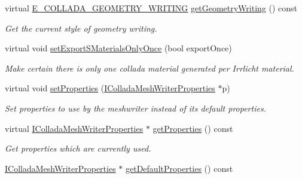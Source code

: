 \begin{DoxyCompactItemize}
\mbox{\label{classirr_1_1scene_1_1IColladaMeshWriter_ab83b1690e233d6742e716aa5a1cf32f2}} 
virtual \hyperlink{namespaceirr_1_1scene_a179008e7c02889459edf81394dbd6959}{E\+\_\+\+C\+O\+L\+L\+A\+D\+A\+\_\+\+G\+E\+O\+M\+E\+T\+R\+Y\+\_\+\+W\+R\+I\+T\+I\+NG} \hyperlink{classirr_1_1scene_1_1IColladaMeshWriter_ab83b1690e233d6742e716aa5a1cf32f2}{get\+Geometry\+Writing} () const
\begin{DoxyCompactList}\small\item\em Get the current style of geometry writing. \end{DoxyCompactList}\item 
virtual void \hyperlink{classirr_1_1scene_1_1IColladaMeshWriter_af6f37ca4a1ef6238cc079f3f5d5eb612}{set\+Export\+S\+Materials\+Only\+Once} (bool export\+Once)
\begin{DoxyCompactList}\small\item\em Make certain there is only one collada material generated per Irrlicht material. \end{DoxyCompactList}\item 
virtual void \hyperlink{classirr_1_1scene_1_1IColladaMeshWriter_acffa89579171224f10e30f2c0d09f8c1}{set\+Properties} (\hyperlink{classirr_1_1scene_1_1IColladaMeshWriterProperties}{I\+Collada\+Mesh\+Writer\+Properties} $\ast$p)
\begin{DoxyCompactList}\small\item\em Set properties to use by the meshwriter instead of it\textquotesingle{}s default properties. \end{DoxyCompactList}\item 
\mbox{\label{classirr_1_1scene_1_1IColladaMeshWriter_acce5ebec91c7f655da4557953df80a7a}} 
virtual \hyperlink{classirr_1_1scene_1_1IColladaMeshWriterProperties}{I\+Collada\+Mesh\+Writer\+Properties} $\ast$ \hyperlink{classirr_1_1scene_1_1IColladaMeshWriter_acce5ebec91c7f655da4557953df80a7a}{get\+Properties} () const
\begin{DoxyCompactList}\small\item\em Get properties which are currently used. \end{DoxyCompactList}\item 
\hyperlink{classirr_1_1scene_1_1IColladaMeshWriterProperties}{I\+Collada\+Mesh\+Writer\+Properties} $\ast$ \hyperlink{classirr_1_1scene_1_1IColladaMeshWriter_ae5d7e19d6d4bba65bcfb006c011cb6f2}{get\+Default\+Properties} () const

\end{DoxyCompactItemize}
